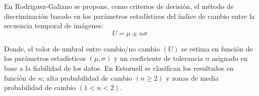 En Rodriguez-Galiano \cite{rodriguez2010analisis} se propone, como criterios de decisi\'on, el m\'etodo de discriminaci\'on basado en los par\'ametros estad\'isticos del \'indice de cambio entre la secuencia temporal de im\'agenes:
\begin{equation}
U=\mu \pm n\sigma
\end{equation}

Donde, el valor de umbral entre cambio/no cambio $ (U) $ se estima en funci\'on de los par\'ametros estad\'isticos $ (\mu, \sigma) $ y un coeficiente de tolerancia $ n $ asignado en base a la fiabilidad de los datos. En Estornell \cite{estornell2004analisis} se clasifican los resultados en funci\'on de $ n $; alta probabilidad de cambio $ (n \geq 2) $ y
zonas de media probabilidad de cambio $ (1 < n < 2) $.









